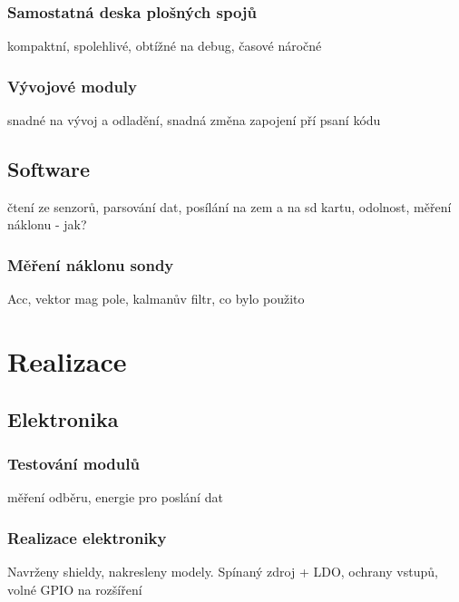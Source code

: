 \documentclass[twoside]{ctuthesis}
\theoremstyle{plain}
\theoremstyle{definition}
\theoremstyle{note}
\begin{document}
		\subsection{Samostatná deska plošných spojů}
		kompaktní, spolehlivé, obtížné na debug, časové náročné
		\subsection{Vývojové moduly}
		snadné na vývoj a odladění, snadná změna zapojení pří psaní kódu

	\section{Software}
	čtení ze senzorů, parsování dat, posílání na zem a na sd kartu, odolnost, měření náklonu - jak?
		\subsection{Měření náklonu sondy}
		Acc, vektor mag pole, kalmanův filtr, co bylo použito



\chapter{Realizace}
	\section{Elektronika}
		\subsection{Testování modulů}
		měření odběru, energie pro poslání dat

		\subsection{Realizace elektroniky}
		Navrženy shieldy, nakresleny modely. Spínaný zdroj + LDO, ochrany vstupů, volné GPIO na rozšíření

\end{document}
